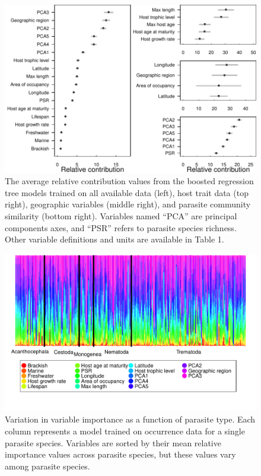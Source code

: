 \documentclass[12pt]{article}
\begin{document}
\newpage
 \begin{figure}[h!]
  \includegraphics[width=\textwidth]{Figures/megaBRT.pdf}
  \caption{The average relative contribution values from the boosted regression tree models trained on all available data (left), host trait data (top right), geographic variables (middle right), and parasite community similarity (bottom right). Variables named ``PCA'' are principal components axes, and ``PSR'' refers to parasite species richness. Other variable definitions and units are available in Table 1. }
 \label{fig:megaBRT}
 \end{figure}

 \newpage
 \begin{figure}[h!]
  \includegraphics[width=\textwidth]{Figures/parTypeColor.pdf}
  \caption{Variation in variable importance as a function of parasite type. Each column represents a model trained on occurrence data for a single parasite species. Variables are sorted by their mean relative importance values across parasite species, but these values vary among parasite species.}
 \label{fig:parType}
 \end{figure}
\end{document}

